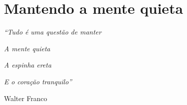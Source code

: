 \chapter{Mantendo a mente quieta}

\singlespacing
\begin{flushright}

\textit{``Tudo é uma questão de manter}

\textit{A mente quieta}

\textit{A espinha ereta}

\textit{E o coração tranquilo''}

Walter Franco

\end{flushright}
\doublespacing








